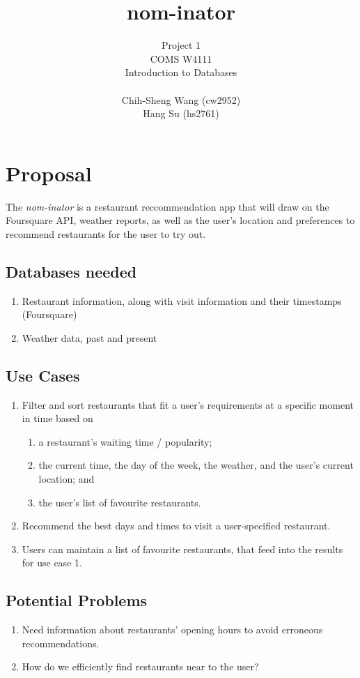\documentclass[10pt]{article}
\title{nom-inator}
\author
{
    Project 1 \\
    COMS W4111 \\
    Introduction to Databases \\\\
    Chih-Sheng Wang (cw2952)\\
    Hang Su (hs2761)
}
\date
\begin{document}
\maketitle

\section*{Proposal}

The \emph{nom-inator} is a restaurant reccommendation app that will draw on the Foursquare API, weather reports, as well as the user's location and preferences to recommend restaurants for the user to try out.

\subsection*{Databases needed}
\begin{enumerate}
\item{Restaurant information, along with visit information and their timestamps (Foursquare)}
\item{Weather data, past and present}
\end{enumerate}

\subsection*{Use Cases}

\begin{enumerate}
\item
{
    Filter and sort restaurants that fit a user's requirements at a specific moment in time based on
    \begin{enumerate}
    \item{a restaurant's waiting time / popularity;}
    \item{the current time, the day of the week, the weather, and the user's current location; and}
    \item{the user's list of favourite restaurants.}
    \end{enumerate}
}
\item{Recommend the best days and times to visit a user-specified restaurant.}
\item{Users can maintain a list of favourite restaurants, that feed into the results for use case 1.}
\end{enumerate}

\subsection*{Potential Problems}
\begin{enumerate}
\item{Need information about restaurants' opening hours to avoid erroneous recommendations.}
\item{How do we efficiently find restaurants near to the user?}
\end{enumerate}
\end{document}
